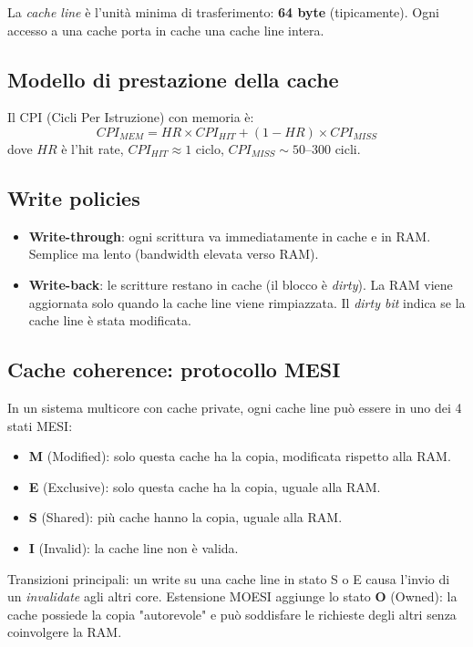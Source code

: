 \documentclass[11pt,a4paper]{article}
\theoremstyle{remark}
\begin{document}
La \emph{cache line} è l'unità minima di trasferimento: \textbf{64 byte} (tipicamente). Ogni accesso a una cache porta in cache una cache line intera.

\subsection{Modello di prestazione della cache}

Il CPI (Cicli Per Istruzione) con memoria è:
\begin{equation}
  CPI_{MEM} = HR \times CPI_{HIT} + (1-HR) \times CPI_{MISS}
\end{equation}
dove $HR$ è l'hit rate, $CPI_{HIT} \approx 1$ ciclo, $CPI_{MISS} \sim 50$--300 cicli.

\subsection{Write policies}

\begin{itemize}
  \item \textbf{Write-through}: ogni scrittura va immediatamente in cache e in RAM. Semplice ma lento (bandwidth elevata verso RAM).
  \item \textbf{Write-back}: le scritture restano in cache (il blocco è \emph{dirty}). La RAM viene aggiornata solo quando la cache line viene rimpiazzata. Il \emph{dirty bit} indica se la cache line è stata modificata.
\end{itemize}

\subsection{Cache coherence: protocollo MESI}

In un sistema multicore con cache private, ogni cache line può essere in uno dei 4 stati MESI:

\begin{itemize}
  \item \textbf{M} (Modified): solo questa cache ha la copia, modificata rispetto alla RAM.
  \item \textbf{E} (Exclusive): solo questa cache ha la copia, uguale alla RAM.
  \item \textbf{S} (Shared): più cache hanno la copia, uguale alla RAM.
  \item \textbf{I} (Invalid): la cache line non è valida.
\end{itemize}

Transizioni principali: un write su una cache line in stato S o E causa l'invio di un \emph{invalidate} agli altri core. Estensione MOESI aggiunge lo stato \textbf{O} (Owned): la cache possiede la copia "autorevole" e può soddisfare le richieste degli altri senza coinvolgere la RAM.
\end{document}
